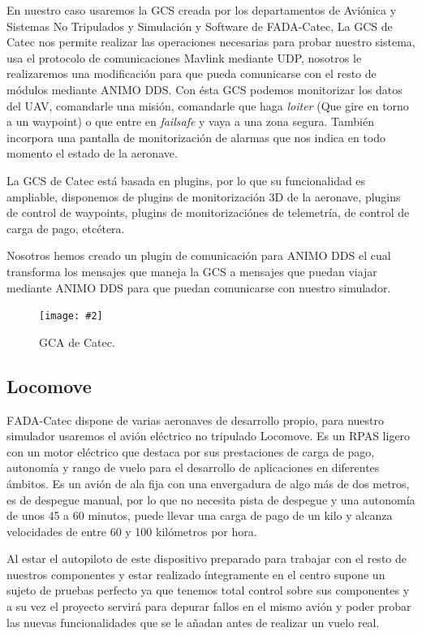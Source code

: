 \documentclass[12pt,a4paper,spanish]{book} %
\newcommand{\imgCentrada}[3]{
\begin{figure}[H]
\begin{center}
\texttt{[image: \#2]}
\caption{#3}
\label{#1}
\end{center}
\end{figure}
}
\begin{document}
En nuestro caso usaremos la GCS creada por los departamentos de Aviónica y Sistemas No Tripulados y Simulación y Software de FADA-Catec, La GCS de Catec nos permite realizar las operaciones necesarias para probar nuestro sistema, usa el protocolo de comunicaciones Mavlink mediante UDP, nosotros le realizaremos una modificación para que pueda comunicarse con el resto de módulos mediante ANIMO DDS. Con ésta GCS podemos monitorizar los datos del UAV, comandarle una misión, comandarle que haga \emph{loiter} (Que gire en torno a un waypoint) o que entre en \emph{failsafe} y vaya a una zona segura. También incorpora una pantalla de monitorización de alarmas que nos indica en todo momento el estado de la aeronave.

La GCS de Catec está basada en plugins, por lo que su funcionalidad es ampliable, disponemos de plugins de monitorización 3D de la aeronave, plugins de control de waypoints, plugins de monitorizaciónes de telemetría, de control de carga de pago, etcétera.

Nosotros hemos creado un plugin de comunicación para ANIMO DDS el cual transforma los mensajes que maneja la GCS a mensajes que puedan viajar mediante ANIMO DDS para que puedan comunicarse con nuestro simulador.

\imgCentrada{fig.2.25}{img/gcscatec.eps}{GCA de Catec.}

\newpage

\subsection{Locomove}

\lettrine{F}{ADA}-Catec dispone de varias aeronaves de desarrollo propio, para nuestro simulador usaremos el avión eléctrico no tripulado Locomove. Es un RPAS ligero con un motor eléctrico que destaca por sus prestaciones de carga de pago, autonomía y rango de vuelo para el desarrollo de aplicaciones en diferentes ámbitos. Es un avión de ala fija con una envergadura de algo más de dos metros, es de despegue manual, por lo que no necesita pista de despegue y una autonomía de unos 45 a 60 minutos, puede llevar una carga de pago de un kilo y alcanza velocidades de entre 60 y 100 kilómetros por hora.

Al estar el autopiloto de este dispositivo preparado para trabajar con el resto de nuestros componentes y estar realizado íntegramente en el centro supone un sujeto de pruebas perfecto ya que tenemos total control sobre sus componentes y a su vez el proyecto servirá para depurar fallos en el mismo avión y poder probar las nuevas funcionalidades que se le añadan antes de realizar un vuelo real.
\end{document}
